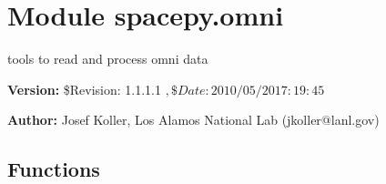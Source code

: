 %
%
%


\section{Module spacepy.omni}

    \label{spacepy:omni}
tools to read and process omni data

\textbf{Version:} \$Revision: 1.1.1.1 $, \$Date: 2010/05/20 17:19:45 $



\textbf{Author:} Josef Koller, Los Alamos National Lab (jkoller@lanl.gov)





  \subsection{Functions}

    \label{spacepy:omni:getomni}

    \vspace{0.5ex}

